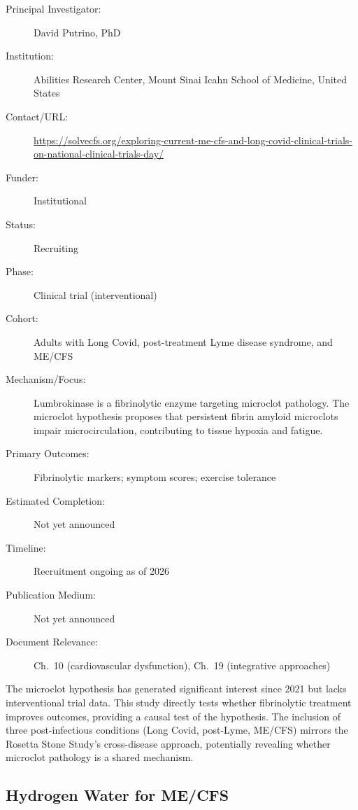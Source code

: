 \begin{description}
    \item[Principal Investigator:] David Putrino, PhD
    \item[Institution:] Abilities Research Center, Mount Sinai Icahn School
        of Medicine, United States
    \item[Contact/URL:] \url{https://solvecfs.org/exploring-current-me-cfs-and-long-covid-clinical-trials-on-national-clinical-trials-day/}
    \item[Funder:] Institutional
    \item[Status:] Recruiting
    \item[Phase:] Clinical trial (interventional)
    \item[Cohort:] Adults with Long Covid, post-treatment Lyme disease
        syndrome, and ME/CFS
    \item[Mechanism/Focus:] Lumbrokinase is a fibrinolytic enzyme targeting
        microclot pathology.  The microclot hypothesis proposes that
        persistent fibrin amyloid microclots impair microcirculation,
        contributing to tissue hypoxia and fatigue.
    \item[Primary Outcomes:] Fibrinolytic markers; symptom scores; exercise
        tolerance
    \item[Estimated Completion:] Not yet announced
    \item[Timeline:] Recruitment ongoing as of 2026
    \item[Publication Medium:] Not yet announced
    \item[Document Relevance:] Ch.~10 (cardiovascular dysfunction),
        Ch.~19 (integrative approaches)
\end{description}

The microclot hypothesis has generated significant interest since 2021 but
lacks interventional trial data.  This study directly tests whether
fibrinolytic treatment improves outcomes, providing a causal test of the
hypothesis.  The inclusion of three post-infectious conditions (Long Covid,
post-Lyme, ME/CFS) mirrors the Rosetta Stone Study's cross-disease approach,
potentially revealing whether microclot pathology is a shared mechanism.

\subsection{Hydrogen Water for ME/CFS}
\label{sec:registry-hydrogen-water}

